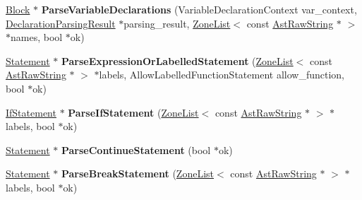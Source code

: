 \begin{DoxyCompactItemize}
\item 
\hyperlink{classv8_1_1internal_1_1_block}{Block} $\ast$ {\bfseries Parse\+Variable\+Declarations} (Variable\+Declaration\+Context var\+\_\+context, \hyperlink{structv8_1_1internal_1_1_parser_1_1_declaration_parsing_result}{Declaration\+Parsing\+Result} $\ast$parsing\+\_\+result, \hyperlink{classv8_1_1internal_1_1_zone_list}{Zone\+List}$<$ const \hyperlink{classv8_1_1internal_1_1_ast_raw_string}{Ast\+Raw\+String} $\ast$ $>$ $\ast$names, bool $\ast$ok)\hypertarget{classv8_1_1internal_1_1_parser_a778325b8295b1e84a33687d838e5cced}{}\label{classv8_1_1internal_1_1_parser_a778325b8295b1e84a33687d838e5cced}

\item 
\hyperlink{classv8_1_1internal_1_1_statement}{Statement} $\ast$ {\bfseries Parse\+Expression\+Or\+Labelled\+Statement} (\hyperlink{classv8_1_1internal_1_1_zone_list}{Zone\+List}$<$ const \hyperlink{classv8_1_1internal_1_1_ast_raw_string}{Ast\+Raw\+String} $\ast$ $>$ $\ast$labels, Allow\+Labelled\+Function\+Statement allow\+\_\+function, bool $\ast$ok)\hypertarget{classv8_1_1internal_1_1_parser_aab6f4621675a0fcb9accf415a59625b6}{}\label{classv8_1_1internal_1_1_parser_aab6f4621675a0fcb9accf415a59625b6}

\item 
\hyperlink{classv8_1_1internal_1_1_if_statement}{If\+Statement} $\ast$ {\bfseries Parse\+If\+Statement} (\hyperlink{classv8_1_1internal_1_1_zone_list}{Zone\+List}$<$ const \hyperlink{classv8_1_1internal_1_1_ast_raw_string}{Ast\+Raw\+String} $\ast$ $>$ $\ast$labels, bool $\ast$ok)\hypertarget{classv8_1_1internal_1_1_parser_a1f704e693d6f0d790947ba86e45bed24}{}\label{classv8_1_1internal_1_1_parser_a1f704e693d6f0d790947ba86e45bed24}

\item 
\hyperlink{classv8_1_1internal_1_1_statement}{Statement} $\ast$ {\bfseries Parse\+Continue\+Statement} (bool $\ast$ok)\hypertarget{classv8_1_1internal_1_1_parser_a27f0ae1e70b83eaa9409654d9667e5c3}{}\label{classv8_1_1internal_1_1_parser_a27f0ae1e70b83eaa9409654d9667e5c3}

\item 
\hyperlink{classv8_1_1internal_1_1_statement}{Statement} $\ast$ {\bfseries Parse\+Break\+Statement} (\hyperlink{classv8_1_1internal_1_1_zone_list}{Zone\+List}$<$ const \hyperlink{classv8_1_1internal_1_1_ast_raw_string}{Ast\+Raw\+String} $\ast$ $>$ $\ast$labels, bool $\ast$ok)\hypertarget{classv8_1_1internal_1_1_parser_add0ab8300d8164db1dc875013e36cf21}{}\label{classv8_1_1internal_1_1_parser_add0ab8300d8164db1dc875013e36cf21}


\end{DoxyCompactItemize}
